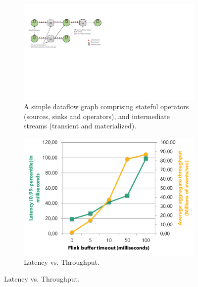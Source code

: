\begin{figure}[t!]
\begin{minipage}{1.1\linewidth}
      \centering
       \hspace{-0.05\linewidth}
      \begin{minipage}{0.60\linewidth}
        \begin{figure}[H]
        \centering
        \includegraphics[width=.999\textwidth]{figs/dataflow}
        \vspace{-3mm}
        \caption{A simple dataflow graph comprising stateful operators (sources, sinks and operators), and intermediate streams (transient and materialized).}
        \label{fig:dataflow}
        \end{figure}
      \end{minipage}
      \begin{minipage}{0.4\linewidth}
          \begin{figure}[H]
				\includegraphics[width=.95\textwidth]{figs/latency-throughput.pdf}
				\vspace{-3mm}
    			\caption{Latency vs. Throughput.}
    			\label{fig:latency-throughput}
          \end{figure}
      \end{minipage}
  \end{minipage}
\end{figure}








